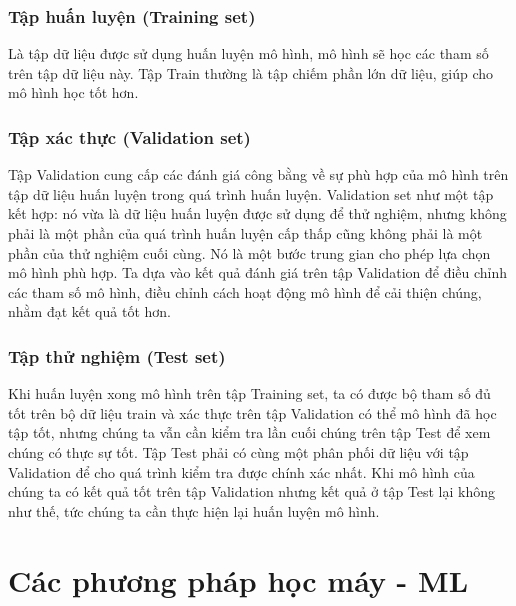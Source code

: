 \subsubsection{Tập huấn luyện (Training set)}
Là tập dữ liệu được sử dụng huấn luyện mô hình, mô hình sẽ học các tham số trên tập dữ liệu này. Tập Train thường là tập chiếm phần lớn dữ liệu, giúp cho mô hình học tốt hơn.
\subsubsection{Tập xác thực (Validation set)}
Tập Validation cung cấp các đánh giá công bằng về sự phù hợp của mô hình trên tập dữ liệu huấn luyện trong quá trình huấn luyện. Validation set như một tập kết hợp: nó vừa là dữ liệu huấn luyện được sử dụng để thử nghiệm, nhưng không phải là một phần của quá trình huấn luyện cấp thấp cũng không phải là một phần của thử nghiệm cuối cùng. Nó là một bước trung gian cho phép lựa chọn mô hình phù hợp. Ta dựa vào kết quả đánh giá trên tập Validation để điều chỉnh các tham số mô hình, điều chỉnh cách hoạt động mô hình để cải thiện chúng, nhằm đạt kết quả tốt hơn.
\subsubsection{Tập thử nghiệm (Test set)}
Khi huấn luyện xong mô hình trên tập Training set, ta có được bộ tham số đủ tốt trên bộ dữ liệu train và xác thực trên tập Validation có thể mô hình đã học tập tốt, nhưng chúng ta vẫn cần kiểm tra lần cuối chúng trên tập Test để xem chúng có thực sự tốt. Tập Test phải có cùng một phân phối dữ liệu với tập Validation để cho quá trình kiểm tra được chính xác nhất. Khi mô hình của chúng ta có kết quả tốt trên tập Validation nhưng kết quả ở tập Test lại không như thế, tức chúng ta cần thực hiện lại huấn luyện mô hình.

\section{Các phương pháp học máy - ML}
